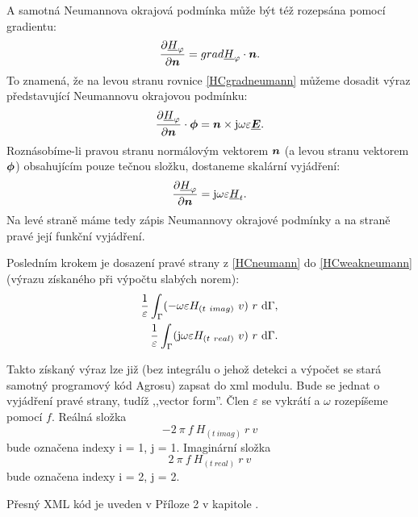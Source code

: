 \documentclass[12pt,a4paper,oneside]{article}
\numberwithin{equation}{section} %
\numberwithin{figure}{section} %
\numberwithin{table}{section} %
\newcommand{\mj}{\mathrm{j}} %
\renewcommand{\vec}[1]{\mbox{\boldmath$#1$}} %
\newcommand{\faz}[1]{{\underline{#1}}} %
\begin{document}
A samotná Neumannova okrajová podmínka může být též rozepsána pomocí gradientu:
\begin{equation}
\label{HCgradneumann}
\frac{\partial \faz{H} _{\varphi}}{\partial \vec{n}} = grad \faz{H} _{\varphi} \cdot \vec{n} .
\end{equation}
To znamená, že na levou stranu rovnice \ref{HCgradneumann} můžeme dosadit výraz představující Neumannovu okrajovou podmínku:
\begin{equation}
\frac{\partial \faz{H}_{\varphi}}{\partial \vec{n}} \cdot \vec{\phi} = \vec{n} \times \mj \omega \varepsilon \faz{\vec{E}} .
\end{equation}
Roznásobíme-li pravou stranu normálovým vektorem $\vec{n}$ (a levou stranu vektorem $\vec{\phi}$) obsahujícím pouze tečnou složku, dostaneme skalární vyjádření:
\begin{equation}
\label{HCneumann}
\frac{\partial \faz{H} _{\varphi}}{\partial \vec{n}} = \mj \omega \varepsilon \faz{H} _t .
\end{equation}
Na levé straně máme tedy zápis Neumannovy okrajové podmínky a na straně pravé její funkční vyjádření.

Posledním krokem je dosazení pravé strany z \ref{HCneumann} do \ref{HCweakneumann} (výrazu získaného při výpočtu slabých norem):
\begin{subequations}
\begin{align}
\frac{1}{\varepsilon} \int _{\Gamma} (- \omega \varepsilon H_{(t~imag)} ~ v ) ~ r ~ \ud \Gamma ,
\\ 
\frac{1}{\varepsilon} \int _{\Gamma} ( \mj \omega \varepsilon H_{(t~real)} ~ v ) ~ r ~ \ud \Gamma .
\end{align}
\end{subequations}

Takto získaný výraz lze již (bez integrálu o jehož detekci a výpočet se stará samotný programový kód Agrosu) zapsat do xml modulu. Bude se jednat o vyjádření pravé strany, tudíž ,,vector form''. Člen $\varepsilon$ se vykrátí a $\omega$ rozepíšeme pomocí $f$. Reálná složka 
\begin{equation}
- 2 ~ \pi ~ f ~ H_{(t~imag)} ~ r ~ v
\end{equation} 
bude označena indexy i = 1, j = 1. Imaginární složka 
\begin{equation}
2 ~ \pi ~ f ~ H_{(t~real)} ~ r ~ v
\end{equation}
bude označena indexy i = 2, j = 2.

Přesný XML kód je uveden v Příloze 2 v kapitole .
\end{document}
